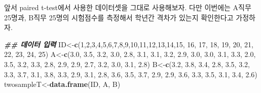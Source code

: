 \documentclass[
]{book}
\newenvironment{Shaded}{\begin{snugshade}}{\end{snugshade}}
\newcommand{\DecValTok}[1]{\textcolor[rgb]{0.00,0.00,0.81}{#1}}
\newcommand{\DocumentationTok}[1]{\textcolor[rgb]{0.56,0.35,0.01}{\textbf{\textit{#1}}}}
\newcommand{\FloatTok}[1]{\textcolor[rgb]{0.00,0.00,0.81}{#1}}
\newcommand{\FunctionTok}[1]{\textcolor[rgb]{0.13,0.29,0.53}{\textbf{#1}}}
\newcommand{\NormalTok}[1]{#1}
\newcommand{\OtherTok}[1]{\textcolor[rgb]{0.56,0.35,0.01}{#1}}
\begin{document}
앞서 paired t-test에서 사용한 데이터셋을 그대로 사용해보자. 다만 이번에는 A직무 25명과, B직무 25명의 시험점수를 측정해서 학년간 격차가 있는지 확인한다고 가정하자.

\begin{Shaded}
\begin{Highlighting}[]

\DocumentationTok{\#\# 데이터 입력}
\NormalTok{ID}\OtherTok{\textless{}{-}}\FunctionTok{c}\NormalTok{(}\DecValTok{1}\NormalTok{,}\DecValTok{2}\NormalTok{,}\DecValTok{3}\NormalTok{,}\DecValTok{4}\NormalTok{,}\DecValTok{5}\NormalTok{,}\DecValTok{6}\NormalTok{,}\DecValTok{7}\NormalTok{,}\DecValTok{8}\NormalTok{,}\DecValTok{9}\NormalTok{,}\DecValTok{10}\NormalTok{,}\DecValTok{11}\NormalTok{,}\DecValTok{12}\NormalTok{,}\DecValTok{13}\NormalTok{,}\DecValTok{14}\NormalTok{,}\DecValTok{15}\NormalTok{, }\DecValTok{16}\NormalTok{, }\DecValTok{17}\NormalTok{, }\DecValTok{18}\NormalTok{, }\DecValTok{19}\NormalTok{, }\DecValTok{20}\NormalTok{, }\DecValTok{21}\NormalTok{, }\DecValTok{22}\NormalTok{, }\DecValTok{23}\NormalTok{, }\DecValTok{24}\NormalTok{, }\DecValTok{25}\NormalTok{) }
\NormalTok{A}\OtherTok{\textless{}{-}}\FunctionTok{c}\NormalTok{(}\FloatTok{3.0}\NormalTok{, }\FloatTok{3.5}\NormalTok{, }\FloatTok{3.2}\NormalTok{, }\FloatTok{3.0}\NormalTok{, }\FloatTok{2.8}\NormalTok{, }\FloatTok{3.1}\NormalTok{, }\FloatTok{3.1}\NormalTok{, }\FloatTok{3.2}\NormalTok{, }\FloatTok{2.9}\NormalTok{, }\FloatTok{3.0}\NormalTok{, }\FloatTok{3.0}\NormalTok{, }\FloatTok{3.1}\NormalTok{, }\FloatTok{3.3}\NormalTok{, }\FloatTok{2.0}\NormalTok{, }\FloatTok{3.5}\NormalTok{, }\FloatTok{3.2}\NormalTok{, }\FloatTok{3.3}\NormalTok{, }\FloatTok{2.8}\NormalTok{, }\FloatTok{2.9}\NormalTok{, }\FloatTok{2.9}\NormalTok{, }\FloatTok{2.7}\NormalTok{, }\FloatTok{3.2}\NormalTok{, }\FloatTok{3.0}\NormalTok{, }\FloatTok{3.1}\NormalTok{, }\FloatTok{2.8}\NormalTok{)  }
\NormalTok{B}\OtherTok{\textless{}{-}}\FunctionTok{c}\NormalTok{(}\FloatTok{3.2}\NormalTok{, }\FloatTok{3.8}\NormalTok{, }\FloatTok{3.4}\NormalTok{, }\FloatTok{2.8}\NormalTok{, }\FloatTok{3.5}\NormalTok{, }\FloatTok{3.2}\NormalTok{, }\FloatTok{3.3}\NormalTok{, }\FloatTok{3.7}\NormalTok{, }\FloatTok{3.1}\NormalTok{, }\FloatTok{3.8}\NormalTok{, }\FloatTok{3.3}\NormalTok{, }\FloatTok{2.9}\NormalTok{, }\FloatTok{3.1}\NormalTok{, }\FloatTok{2.8}\NormalTok{, }\FloatTok{3.6}\NormalTok{, }\FloatTok{3.5}\NormalTok{, }\FloatTok{3.7}\NormalTok{, }\FloatTok{2.9}\NormalTok{, }\FloatTok{2.9}\NormalTok{, }\FloatTok{3.6}\NormalTok{, }\FloatTok{3.3}\NormalTok{, }\FloatTok{3.5}\NormalTok{, }\FloatTok{3.1}\NormalTok{, }\FloatTok{3.4}\NormalTok{, }\FloatTok{2.6}\NormalTok{)}
\NormalTok{twosampleT}\OtherTok{\textless{}{-}}\FunctionTok{data.frame}\NormalTok{(ID, A, B)}


\end{Highlighting}
\end{Shaded}
\end{document}
